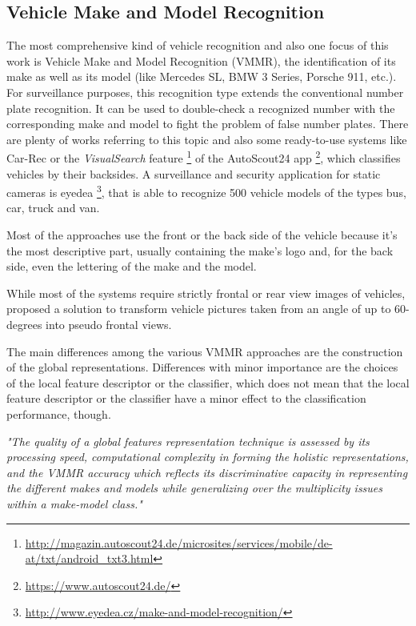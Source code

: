 \subsection{Vehicle Make and Model Recognition}\label{sec:vmmrStateOfTheArt}
The most comprehensive kind of vehicle recognition and also one focus of this work is Vehicle Make and Model Recognition (VMMR), the identification of its make as well as its model (like Mercedes SL, BMW 3 Series, Porsche 911, etc.). For surveillance purposes, this recognition type extends the conventional number plate recognition. It can be used to double-check a recognized number with the corresponding make and model to fight the problem of false number plates. There are plenty of works referring to this topic and also some ready-to-use systems like Car-Rec \citep{jang2011car} or the \emph{VisualSearch} feature \footnote{\url{http://magazin.autoscout24.de/microsites/services/mobile/de-at/txt/android_txt3.html}} of the AutoScout24 app \footnote{\url{https://www.autoscout24.de/}}, which classifies vehicles by their backsides.
A surveillance and security application for static cameras is eyedea \footnote{\url{http://www.eyedea.cz/make-and-model-recognition/}}, that is able to recognize 500 vehicle models of the types bus, car, truck and van.

Most of the approaches use the front or the back side of the vehicle because it's the most descriptive part, usually containing the make's logo and, for the back side, even the lettering of the make and the model.

While most of the systems require strictly frontal or rear view images of vehicles, \citeauthor{shinozuka2013vehicle} proposed a solution to transform vehicle pictures taken from an angle of up to 60-degrees into pseudo frontal views.

The main differences among the various VMMR approaches are the construction of the global representations. Differences with minor importance are the choices of the local feature descriptor or the classifier, which does not mean that the local feature descriptor or the classifier have a minor effect to the classification performance, though.

\emph{"The quality of a global features representation technique is assessed by its processing speed, computational complexity in forming the holistic representations, and the VMMR accuracy which reflects its discriminative capacity in representing the different makes and models while generalizing over the multiplicity issues within a make-model class."} \citep{siddiqui2015robust}

